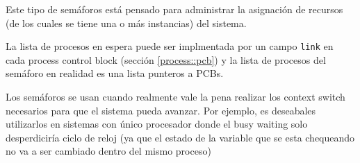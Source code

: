 Este tipo de semáforos está pensado para administrar la asignación de recursos (de los cuales se tiene una o más instancias) del sistema.

La lista de procesos en espera puede ser implmentada por un campo \texttt{link} en cada process control block (sección \ref{process::pcb}) y la lista de procesos del semáforo en realidad es una lista punteros a PCBs.

Los semáforos se usan cuando realmente vale la pena realizar los context switch necesarios para que el sistema pueda avanzar. Por ejemplo, es deseabales utilizarlos en sistemas con único procesador donde el busy waiting solo desperdiciría ciclo de reloj (ya que el estado de la variable que se esta chequeando no va a ser cambiado dentro del mismo proceso)
%
%
%
%
%
%	

